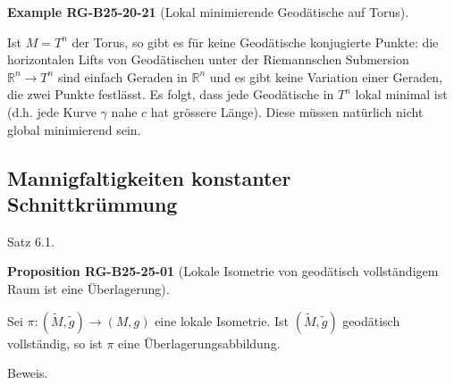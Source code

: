 \documentclass[10pt, letterpaper]{article}
\newcommand{\CustomHeading}[3]{%
  \par\medskip\noindent%
  \textbf{#1 #2} \textnormal{(#3)}.\enskip%
}
\newenvironment{PROP}[2]{\begin{unitbox}\CustomHeading{Proposition}{#1}{#2}}{\end{unitbox}}
\newenvironment{EXA}[2]{\begin{unitbox}\CustomHeading{Example}{#1}{#2}}{\end{unitbox}}
\begin{document}
\begin{EXA}{RG-B25-20-21}{Lokal minimierende Geodätische auf Torus}
Ist $M=T^{n}$ der Torus, so gibt es für keine Geodätische konjugierte Punkte: die horizontalen Lifts von Geodätischen unter der Riemannschen Submersion $\mathbb{R}^{n} \rightarrow T^{n}$ sind einfach Geraden in $\mathbb{R}^{n}$ und es gibt keine Variation einer Geraden, die zwei Punkte festlässt. Es folgt, dass jede Geodätische in $T^{n}$ lokal minimal ist (d.h. jede Kurve $\gamma$ nahe $c$ hat grössere Länge). Diese müssen natürlich nicht global minimierend sein.
\end{EXA}



\pagebreak


\subsection{Mannigfaltigkeiten konstanter Schnittkrümmung}



Satz 6.1. 


\begin{PROP}{RG-B25-25-01}{Lokale Isometrie von geodätisch vollständigem Raum ist eine Überlagerung}
Sei $\pi:(\tilde{M}, \tilde{g}) \rightarrow(M, g)$ eine lokale Isometrie. Ist $(\tilde{M}, \tilde{g})$ geodätisch vollständig, so ist $\pi$ eine Überlagerungsabbildung.
\end{PROP}

Beweis. 
\end{document}
